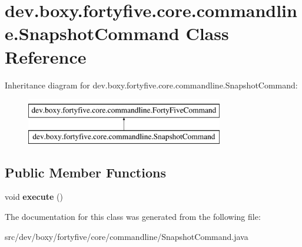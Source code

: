 \hypertarget{classdev_1_1boxy_1_1fortyfive_1_1core_1_1commandline_1_1_snapshot_command}{
\section{dev.boxy.fortyfive.core.commandline.SnapshotCommand Class Reference}
\label{d4/daf/classdev_1_1boxy_1_1fortyfive_1_1core_1_1commandline_1_1_snapshot_command}
}
Inheritance diagram for dev.boxy.fortyfive.core.commandline.SnapshotCommand:\begin{figure}[H]
\begin{center}
\leavevmode
\includegraphics[height=2.000000cm]{d4/daf/classdev_1_1boxy_1_1fortyfive_1_1core_1_1commandline_1_1_snapshot_command}
\end{center}
\end{figure}
\subsection*{Public Member Functions}
\begin{DoxyCompactItemize}
\item 
\hypertarget{classdev_1_1boxy_1_1fortyfive_1_1core_1_1commandline_1_1_snapshot_command_afaa2cff62cd208eec7e5a79b7bb24c01}{
void {\bfseries execute} ()}
\label{d4/daf/classdev_1_1boxy_1_1fortyfive_1_1core_1_1commandline_1_1_snapshot_command_afaa2cff62cd208eec7e5a79b7bb24c01}

\end{DoxyCompactItemize}


The documentation for this class was generated from the following file:\begin{DoxyCompactItemize}
\item 
src/dev/boxy/fortyfive/core/commandline/SnapshotCommand.java\end{DoxyCompactItemize}
